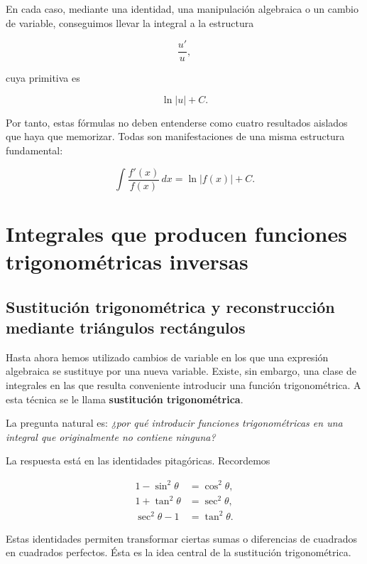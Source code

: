 \documentclass[12pt]{article}
\theoremstyle{definition}
\theoremstyle{remark}
\begin{document}
En cada caso, mediante una identidad, una manipulación algebraica
o un cambio de variable, conseguimos llevar la integral a la
estructura

\[
\boxed{\frac{u'}{u}},
\]

cuya primitiva es

\[
\boxed{\ln|u|+C}.
\]

Por tanto, estas fórmulas no deben entenderse como cuatro resultados
aislados que haya que memorizar. Todas son manifestaciones de una
misma estructura fundamental:

\[
\boxed{
\int\frac{f'(x)}{f(x)}\,dx
=
\ln|f(x)|+C.
}
\]

\section{Integrales que producen funciones trigonométricas inversas}


\subsection*{Sustitución trigonométrica y reconstrucción mediante
triángulos rectángulos}

Hasta ahora hemos utilizado cambios de variable en los que una expresión
algebraica se sustituye por una nueva variable. Existe, sin embargo, una
clase de integrales en las que resulta conveniente introducir una función
trigonométrica. A esta técnica se le llama \textbf{sustitución trigonométrica}.

La pregunta natural es: \emph{¿por qué introducir funciones trigonométricas
en una integral que originalmente no contiene ninguna?}

La respuesta está en las identidades pitagóricas. Recordemos

\[
\boxed{
\begin{aligned}
1-\sin^2\theta&=\cos^2\theta,\\
1+\tan^2\theta&=\sec^2\theta,\\
\sec^2\theta-1&=\tan^2\theta.
\end{aligned}}
\]

Estas identidades permiten transformar ciertas sumas o diferencias de
cuadrados en cuadrados perfectos. Ésta es la idea central de la sustitución
trigonométrica.
\end{document}
